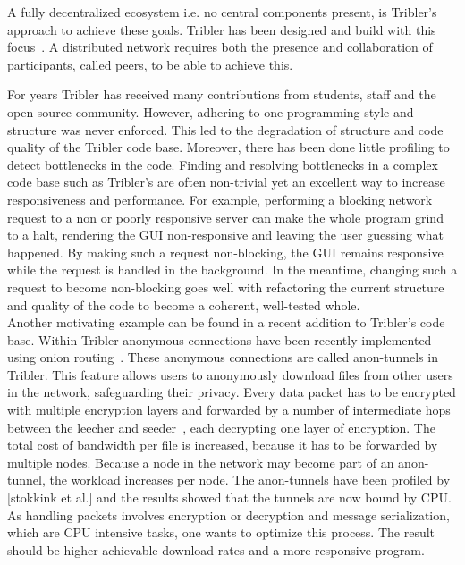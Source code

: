 A fully decentralized ecosystem i.e. no central components present, is Tribler's approach to achieve these goals.
Tribler has been designed and build with this focus~\cite{Pouwelse-tribler,Bakker-tribler}.
A distributed network requires both the presence and collaboration of participants, called peers, to be able to achieve this.


For years Tribler has received many contributions from students, staff and the open-source community.
However, adhering to one programming style and structure was never enforced.
This led to the degradation of structure and code quality of the Tribler code base.
Moreover, there has been done little profiling to detect bottlenecks in the code.
Finding and resolving bottlenecks in a complex code base such as Tribler's are often non-trivial yet an excellent way to increase responsiveness and performance.
For example, performing a blocking network request to a non or poorly responsive server can make the whole program grind to a halt, rendering the GUI non-responsive and leaving the user guessing what happened.
By making such a request non-blocking, the GUI remains responsive while the request is handled in the background.
In the meantime, changing such a request to become non-blocking goes well with refactoring the current structure and quality of the code to become a coherent, well-tested whole.\\

Another motivating example can be found in a recent addition to Tribler's code base.
Within Tribler anonymous connections have been recently implemented using onion routing~\cite{Plak-anonymous,ruigrok-anonymous,tanaskoski-anonymous}.
These anonymous connections are called anon-tunnels in Tribler.
This feature allows users to anonymously download files from other users in the network, safeguarding their privacy.
Every data packet has to be encrypted with multiple encryption layers and forwarded by a number of intermediate hops between the leecher and seeder~\cite{Plak-anonymous,tanaskoski-anonymous}, each decrypting one layer of encryption.
The total cost of bandwidth per file is increased, because it has to be forwarded by multiple nodes.
Because a node in the network may become part of an anon-tunnel, the workload increases per node.
The anon-tunnels have been profiled by [stokkink et al.]  and the results showed that the tunnels are now bound by CPU.
As handling packets involves encryption or decryption and message serialization, which are CPU intensive tasks, one wants to optimize this process.
The result should be higher achievable download rates and a more responsive program.

